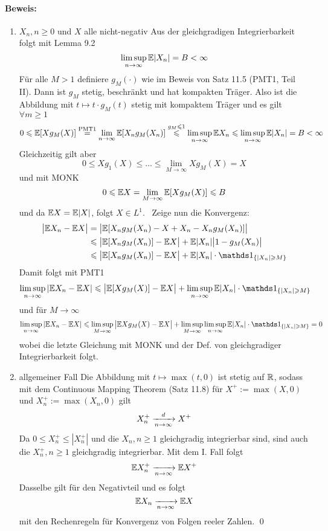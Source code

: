 \paragraph{Beweis:}
\begin{enumerate}[label=\Roman*.]
    \item $X_n,n\geq0$ und $X$ alle nicht-negativ\newline 
    Aus der gleichgradigen Integrierbarkeit folgt mit Lemma 9.2
    $$\displaystyle\limsup_{n\to\infty}\mathbb{E}|X_n|=B<\infty$$
    F\"ur alle $M>1$ definiere $g_M(\cdot)$ wie im Beweis von Satz 11.5 (PMT1, Teil II). Dann ist $g_M$ stetig, beschr\"ankt und hat kompakten Tr\"ager. Also ist die Abbildung mit $t\mapsto t\cdot g_M(t)$ stetig mit kompaktem Tr\"ager und es gilt $\forall m\geq1$
    $$0\leqslant\mathbb{E}[Xg_M(X)]\overset{\text{PMT1}}{=}\lim_{n\to\infty}\mathbb{E}[X_ng_M(X_n)]\overset{g_M\leqslant1}{\leqslant}\limsup_{n\to\infty}\mathbb{E} X_n\leqslant\limsup_{n\to\infty}\mathbb{E} |X_n|=B<\infty$$
    Gleichzeitig gilt aber
    $$0\leq Xg_1(X)\leq\hdots\leq\lim_{M\to\infty}Xg_M(X)=X$$
    und mit MONK %
    $$0\leqslant\mathbb{E} X=\lim_{M\to\infty}\mathbb{E}[Xg_M(X)]\leqslant B$$
    und da $\mathbb{E} X=\mathbb{E}|X|$, folgt $X\in L^1.$ \newline\newline
    Zeige nun die Konvergenz:
    \begin{align*}
        \big|\E X_n-\E X\big|&=\big|\E[X_ng_M(X_n)-X+X_n-X_ng_M(X_n)]\big|\\
        &\leq\big|\E[X_ng_M(X_n)]-\E X\big|+\E|X_n|\big|1-g_M(X_n)\big| \\
        &\leq\big|\E[X_ng_M(X_n)]-\E X\big|+\E|X_n|\cdot\ind{\{|X_n|\geq M\}}
    \end{align*}
    Damit folgt mit PMT1
    $$\limsup_{n\to\infty}|\E X_n-\E X|\leq\big|\E[Xg_M(X)]-\E X\big|+\limsup_{n\to\infty}\E|X_n|\cdot\ind{\{|X_n|\geq M\}}$$
    und f\"ur $M\to\infty$
    $$\limsup_{n\to\infty}|\E X_n-\E X|\leq\limsup_{M\to\infty}\big|\E Xg_M(X)-\E X\big|+\limsup_{M\to\infty}\limsup_{n\to\infty}\E|X_n|\cdot\ind{\{|X_n|\geq M\}}=0$$
    wobei die letzte Gleichung mit MONK und der Def. von  gleichgradiger Integrierbarkeit folgt.
    \item allgemeiner Fall\newline
    Die Abbildung mit $t\mapsto\max(t,0)$ ist stetig auf $\mathbb{R}$, sodass mit dem Continuous Mapping Theorem (Satz 11.8) f\"ur $X^+:=\max(X,0)$ und $X_n^+:=\max(X_n,0)$ gilt
    $$X_n^+\nto{d}{n\to\infty}X^+$$
    Da $0\leq X_n^+\leq|X_n^+|$ und die $X_n,n\geq1$ gleichgradig integrierbar sind, sind auch die $X_n^+,n\geq1$ gleichgradig integrierbar. Mit dem I. Fall folgt 
    $$\E X_n^+\nto{}{n\to\infty}\E X^+$$
    Dasselbe gilt f\"ur den Negativteil und es folgt
    $$\E X_n\nto{}{n\to\infty}\E X$$
    mit den Rechenregeln f\"ur Konvergenz von Folgen reeler Zahlen. \qed
\end{enumerate}

